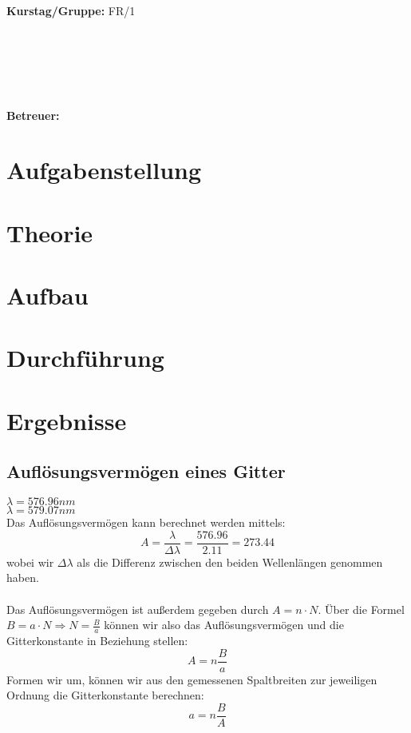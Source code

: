 \documentclass{article}
\begin{document}
\begin{verbatim}


\end{verbatim}
			\begin{flushleft}
			\textbf{\Large{Kurstag/Gruppe:}} \Large{FR/1}
			\end{flushleft}

\begin{verbatim}






\end{verbatim}
			\begin{flushleft}
			\LARGE{\textbf{Betreuer:\Large{ }}}		
			\end{flushleft}
			
\section{Aufgabenstellung}

\section{Theorie}
\subsection{}

\section{Aufbau}

\section{Durchführung}

\section{Ergebnisse}
\subsection*{Auflösungsvermögen eines Gitter}
$\lambda=576.96nm$\\
$\lambda=579.07nm$\\
Das Auflösungsvermögen kann berechnet werden mittels:
$$A=\frac{\lambda}{\Delta\lambda}=\frac{576.96}{2.11}=273.44$$
wobei wir $\Delta\lambda$ als die Differenz zwischen den beiden Wellenlängen genommen haben.\\
\\
Das Auflösungsvermögen ist außerdem gegeben durch $A=n\cdot N$. Über die Formel $B=a\cdot N \Rightarrow N=\frac{B}{a}$ können wir also das Auflösungsvermögen und die Gitterkonstante in Beziehung stellen:
$$A=n\frac{B}{a}$$
Formen wir um, können wir aus den gemessenen Spaltbreiten zur jeweiligen Ordnung die Gitterkonstante berechnen:
$$a=n\frac{B}{A}$$
\end{document}
